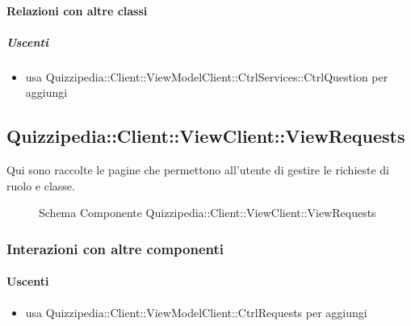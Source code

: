 \paragraph{Relazioni con altre classi}
\subparagraph{Uscenti}
\begin{itemize}
\item usa Quizzipedia::Client::ViewModelClient::CtrlServices::CtrlQuestion per aggiungi
\end{itemize}
\subsection{Quizzipedia::Client::ViewClient::ViewRequests}
Qui sono raccolte le pagine che permettono all'utente di gestire le richieste di ruolo e classe.
\begin{figure}[H]
\centering
\noindent{}
\caption[Schema Componente Quizzipedia::Client::ViewClient::ViewRequests]{Schema Componente Quizzipedia::Client::ViewClient::ViewRequests}
\end{figure}
\subsubsection{Interazioni con altre componenti}
\paragraph{Uscenti}
\begin{itemize}
\item usa Quizzipedia::Client::ViewModelClient::CtrlRequests per aggiungi
\end{itemize}
